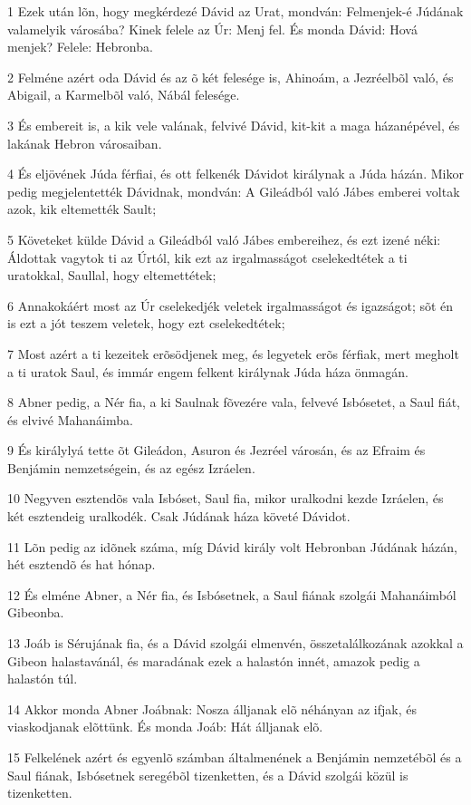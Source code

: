 \par 1 Ezek után lõn, hogy megkérdezé Dávid az Urat, mondván: Felmenjek-é Júdának valamelyik városába? Kinek felele az Úr: Menj fel. És monda Dávid: Hová menjek? Felele: Hebronba.
\par 2 Felméne azért oda Dávid és az õ két felesége is, Ahinoám, a Jezréelbõl való, és Abigail, a Karmelbõl való, Nábál felesége.
\par 3 És embereit is, a kik vele valának, felvivé Dávid, kit-kit a maga házanépével, és lakának Hebron városaiban.
\par 4 És eljövének Júda férfiai, és ott felkenék Dávidot királynak a Júda házán. Mikor pedig megjelentették Dávidnak, mondván: A Gileádból való Jábes emberei voltak azok, kik eltemették Sault;
\par 5 Követeket külde Dávid a Gileádból való Jábes embereihez, és ezt izené néki: Áldottak vagytok ti az Úrtól, kik ezt az irgalmasságot cselekedtétek a ti uratokkal, Saullal, hogy eltemettétek;
\par 6 Annakokáért most az Úr cselekedjék veletek irgalmasságot és igazságot; sõt én is ezt a jót teszem veletek, hogy ezt cselekedtétek;
\par 7 Most azért a ti kezeitek erõsödjenek meg, és legyetek erõs férfiak, mert megholt a ti uratok Saul, és immár engem felkent királynak Júda háza önmagán.
\par 8 Abner pedig, a Nér fia, a ki Saulnak fõvezére vala, felvevé Isbósetet, a Saul fiát, és  elvivé Mahanáimba.
\par 9 És királylyá tette õt Gileádon, Asuron és Jezréel városán, és az Efraim és Benjámin nemzetségein, és az egész Izráelen.
\par 10 Negyven esztendõs vala Isbóset, Saul fia, mikor uralkodni kezde Izráelen, és két esztendeig uralkodék. Csak Júdának háza követé Dávidot.
\par 11 Lõn pedig az idõnek száma, míg Dávid király volt Hebronban Júdának házán, hét esztendõ és hat hónap.
\par 12 És elméne Abner, a Nér fia, és Isbósetnek, a Saul fiának szolgái Mahanáimból Gibeonba.
\par 13 Joáb is Sérujának fia, és a Dávid szolgái elmenvén, összetalálkozának azokkal a Gibeon halastavánál, és maradának ezek a halastón innét, amazok pedig a halastón túl.
\par 14 Akkor monda Abner Joábnak: Nosza álljanak elõ néhányan az ifjak, és viaskodjanak elõttünk. És monda Joáb: Hát álljanak elõ.
\par 15 Felkelének azért és egyenlõ számban általmenének a Benjámin nemzetébõl és a Saul fiának, Isbósetnek seregébõl tizenketten, és a Dávid szolgái közül is tizenketten.

